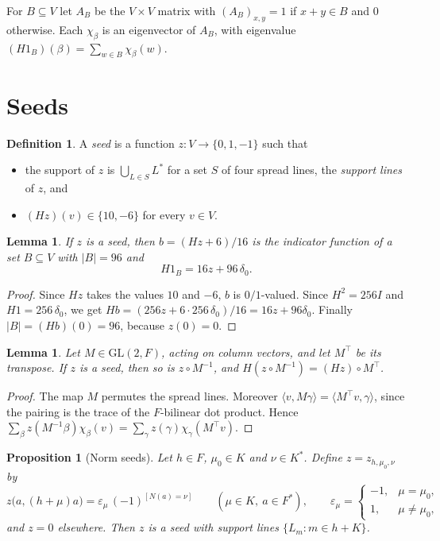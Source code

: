 \documentclass[11pt]{amsart}
\newtheorem{lemma}[theorem]{Lemma}
\newtheorem{proposition}[theorem]{Proposition}
\theoremstyle{definition}
\newtheorem{definition}[theorem]{Definition}
\newcommand{\GL}{\mathrm{GL}}
\begin{document}
For $B\subseteq V$ let $A_B$ be the $V\times V$ matrix with $(A_B)_{x,y}=1$ if $x+y\in B$ and $0$ otherwise. Each $\chi_\beta$ is an eigenvector of $A_B$, with eigenvalue $(H1_B)(\beta)=\sum_{w\in B}\chi_\beta(w)$.

\section{Seeds}\label{sec:seeds}

\begin{definition}\label{def:seed}
A \emph{seed} is a function $z\colon V\to\{0,1,-1\}$ such that
\begin{itemize}
\item the support of $z$ is $\bigcup_{L\in S}L^*$ for a set $S$ of four spread lines, the \emph{support lines} of $z$, and
\item $(Hz)(v)\in\{10,-6\}$ for every $v\in V$.
\end{itemize}
\end{definition}

\begin{lemma}\label{lem:B}
If $z$ is a seed, then $b=(Hz+6)/16$ is the indicator function of a set $B\subseteq V$ with $|B|=96$ and
\[
H1_B=16z+96\,\delta_0 .
\]
\end{lemma}

\begin{proof}
Since $Hz$ takes the values $10$ and $-6$, $b$ is $0/1$-valued. Since $H^2=256I$ and $H1=256\,\delta_0$, we get $Hb=(256z+6\cdot256\,\delta_0)/16=16z+96\delta_0$. Finally $|B|=(Hb)(0)=96$, because $z(0)=0$.
\end{proof}

\begin{lemma}\label{lem:GL}
Let $M\in\GL(2,F)$, acting on column vectors, and let $M^{\top}$ be its transpose. If $z$ is a seed, then so is $z\circ M^{-1}$, and $H(z\circ M^{-1})=(Hz)\circ M^{\top}$.
\end{lemma}

\begin{proof}
The map $M$ permutes the spread lines. Moreover $\langle v,M\gamma\rangle=\langle M^\top v,\gamma\rangle$, since the pairing is the trace of the $F$-bilinear dot product. Hence $\sum_\beta z(M^{-1}\beta)\chi_\beta(v)=\sum_\gamma z(\gamma)\chi_\gamma(M^\top v)$.
\end{proof}

\begin{proposition}[Norm seeds]\label{prop:normseed}
Let $h\in F$, $\mu_0\in K$ and $\nu\in K^*$. Define $z=z_{h,\mu_0,\nu}$ by
\[
z\bigl(a,(h+\mu)a\bigr)=\varepsilon_\mu\,(-1)^{[N(a)=\nu]}\qquad(\mu\in K,\ a\in F^*),\qquad \varepsilon_\mu=\begin{cases}-1,&\mu=\mu_0,\\ 1,&\mu\ne\mu_0,\end{cases}
\]
and $z=0$ elsewhere. Then $z$ is a seed with support lines $\{L_m: m\in h+K\}$.
\end{proposition}
\end{document}
